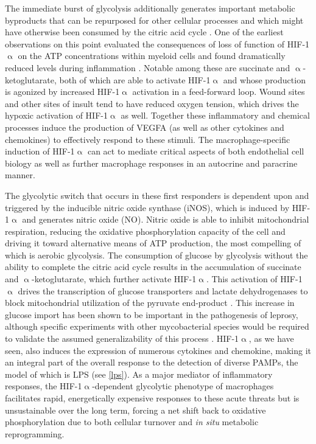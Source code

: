The immediate burst of glycolysis additionally generates important metabolic byproducts that can be repurposed for other cellular processes and which might have otherwise been consumed by the citric acid cycle \citep{Viola2019, Kelly2015}. One of the earliest observations on this point evaluated the consequences of loss of function of HIF\hyp{}1$\upalpha$ on the ATP concentrations within myeloid cells and found dramatically reduced levels during inflammation \citep{Cramer2003}. Notable among these are succinate and $\upalpha$-ketoglutarate, both of which are able to activate HIF-1$\upalpha$ and whose production is agonized by increased HIF-1$\upalpha$ activation in a feed-forward loop. Wound sites and other sites of insult tend to have reduced oxygen tension, which drives the hypoxic activation of HIF-1$\upalpha$ as well. Together these inflammatory and chemical processes induce the production of VEGFA (as well as other cytokines and chemokines) to effectively respond to these stimuli. The macrophage-specific induction of HIF-1$\upalpha$ can act to mediate critical aspects of both endothelial cell biology as well as further macrophage responses in an autocrine and paracrine manner.

The glycolytic switch that occurs in these first responders is dependent upon and triggered by the inducible nitric oxide synthase (iNOS), which is induced by HIF-1$\upalpha$ and generates nitric oxide (NO). Nitric oxide is able to inhibit mitochondrial respiration, reducing the oxidative phosphorylation capacity of the cell and driving it toward alternative means of ATP production, the most compelling of which is aerobic glycolysis. The consumption of glucose by glycolysis without the ability to complete the citric acid cycle results in the accumulation of succinate and $\upalpha$-ketoglutarate, which further activate HIF-1$\upalpha$. This activation of HIF-1$\upalpha$ drives the transcription of glucose transporters and lactate dehydrogenases to block mitochondrial utilization of the pyruvate end-product \citep{Russell2019a, GalvanPena2014}. This increase in glucose import has been shown to be important in the pathogenesis of leprosy, although specific experiments with other mycobacterial species would be required to validate the assumed generalizability of this process \citep{Medeiros2016, MontoyaRosales2016, Vance2019}. HIF-1$\upalpha$, as we have seen, also induces the expression of numerous cytokines and chemokine, making it an integral part of the overall response to the detection of diverse PAMPs, the model of which is LPS (see \autoref{lps}). As a major mediator of inflammatory responses, the HIF-1$\upalpha$-dependent glycolytic phenotype of macrophages facilitates rapid, energetically expensive responses to these acute threats but is unsustainable over the long term, forcing a net shift back to oxidative phosphorylation due to both cellular turnover and \textit{in situ} metabolic reprogramming.

